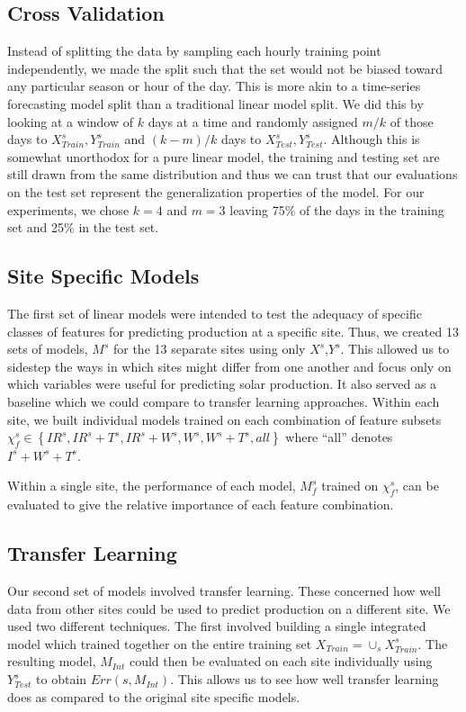 \documentclass[11pt, fullpage,letterpaper]{article}
\begin{document}
\subsection{Cross Validation}

Instead of splitting the data by sampling each hourly training point independently, we made the split such that the set would not be biased toward any particular season or hour of the day. This is more akin to a time-series forecasting model split than a traditional linear model split. We did this by looking at a window of $k$ days at a time and randomly assigned $m / k$ of those days to $X^s_{Train},Y^s_{Train}$ and $(k - m) / k$ days to $X^s_{Test},Y^s_{Test}$. Although this is somewhat unorthodox for a pure linear model, the training and testing set are still drawn from the same distribution and thus we can trust that our evaluations on the test set represent the generalization properties of the model. For our experiments, we chose $k=4$ and $m=3$ leaving 75\% of the days in the training set and 25\% in the test set.

\subsection{Site Specific Models}

The first set of linear models were intended to test the adequacy of specific classes of features for predicting production at a specific site. Thus, we created 13 sets of models, $M^s$ for the 13 separate sites using only $X^s$,$Y^s$. This allowed us to sidestep the ways in which sites might differ from one another and focus only on which variables were useful for predicting solar production. It also served as a baseline which we could compare to transfer learning approaches.
Within each site, we built individual models trained on each combination of feature subsets $\chi_f^s \in \left\{ IR^s,IR^s + T^s, IR^s + W^s, W^s,W^s + T^s, all \right\}$ where ``all'' denotes $I^s+W^s+T^s$. 

Within a single site, the performance of each model, $M_f^s$ trained on $\chi_f^s$, can be evaluated to give the relative importance of each feature combination.

\subsection{Transfer Learning}

Our second set of models involved transfer learning. These concerned how well data from other sites could be used to predict production on a different site. We used two different techniques. The first involved building a single integrated model which trained together on the entire training set $X_{Train}=\cup_s X^s_{Train}$. The resulting model, $M_{Int}$ could then be evaluated on each site individually using $Y^s_{Test}$ to obtain $Err(s,M_{Int})$. This allows us to see how well transfer learning does as compared to the original site specific models. 
\end{document}
